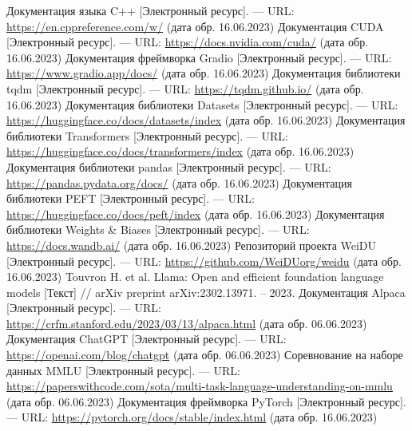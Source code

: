 \begin{thebibliography}{99}
  Документация языка C++ [Электронный ресурс]. --- URL: \url{https://en.cppreference.com/w/} (дата обр. 16.06.2023)
  Документация CUDA [Электронный ресурс]. --- URL: \url{https://docs.nvidia.com/cuda/} (дата обр. 16.06.2023)
  Документация фреймворка Gradio [Электронный ресурс]. --- URL: \url{https://www.gradio.app/docs/} (дата обр. 16.06.2023)
  Документация библиотеки tqdm [Электронный ресурс]. --- URL: \url{https://tqdm.github.io/} (дата обр. 16.06.2023)
  Документация библиотеки Datasets [Электронный ресурс]. --- URL: \url{https://huggingface.co/docs/datasets/index} (дата обр. 16.06.2023)
  Документация библиотеки Transformers [Электронный ресурс]. --- URL: \url{https://huggingface.co/docs/transformers/index} (дата обр. 16.06.2023)
  Документация библиотеки pandas [Электронный ресурс]. --- URL: \url{https://pandas.pydata.org/docs/} (дата обр. 16.06.2023)
  Документация библиотеки PEFT [Электронный ресурс]. --- URL: \url{https://huggingface.co/docs/peft/index} (дата обр. 16.06.2023)
  Документация библиотеки Weights \& Biases [Электронный ресурс]. --- URL: \url{https://docs.wandb.ai/} (дата обр. 16.06.2023)
  Репозиторий проекта WeiDU [Электронный ресурс]. --- URL: \url{https://github.com/WeiDUorg/weidu} (дата обр. 16.06.2023)
  Touvron H. et al. Llama: Open and efficient foundation language models [Текст] // arXiv preprint arXiv:2302.13971. – 2023.
  Документация Alpaca [Электронный ресурс]. --- URL: \url{https://crfm.stanford.edu/2023/03/13/alpaca.html} (дата обр. 06.06.2023)
  Документация ChatGPT [Электронный ресурс]. --- URL: \url{https://openai.com/blog/chatgpt} (дата обр. 06.06.2023)
  Соревнование на наборе данных MMLU [Электронный ресурс]. --- URL: \url{https://paperswithcode.com/sota/multi-task-language-understanding-on-mmlu} (дата обр. 06.06.2023)
  Документация фреймворка PyTorch [Электронный ресурс]. --- URL: \url{https://pytorch.org/docs/stable/index.html} (дата обр. 16.06.2023)
\end{thebibliography}